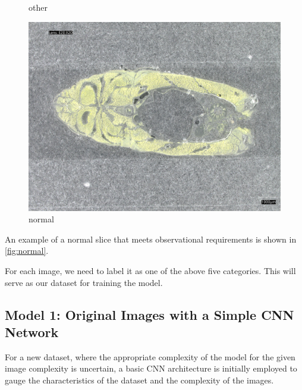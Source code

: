 \begin{figure}[H]
\begin{minipage}{0.32\textwidth}
        \caption{other}
        \label{fig:other}
    \end{minipage}
    \begin{minipage}{0.32\textwidth}
        \centering
        \includegraphics[width=\textwidth]{./fig/sample_1/normal.jpg}
        \caption{normal}
        \label{fig:normal}
    \end{minipage}
\end{figure}

An example of a normal slice that meets observational requirements is shown in \autoref{fig:normal}.


For each image, we need to label it as one of the above five categories. This will serve as our dataset for training the model.

\subsection{Model 1: Original Images with a Simple CNN Network}

For a new dataset, where the appropriate complexity of the model for the given image complexity is uncertain, a basic CNN architecture is initially employed to gauge the characteristics of the dataset and the complexity of the images.

